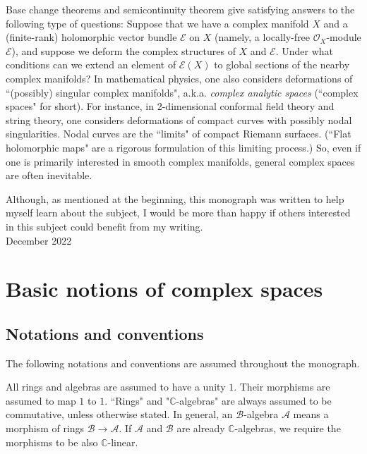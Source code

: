 \documentclass[12pt,b5paper,notitlepage]{report}
\theoremstyle{definition}
\theoremstyle{plain}
\newcommand{\mc}{\mathcal}
\newcommand{\scr}{\mathscr}
\newcommand{\Cbb}{\mathbb C}
\numberwithin{equation}{section}
\begin{document}
Base change theorems and semicontinuity theorem give satisfying answers to the following type of questions: Suppose that we have a complex manifold $X$ and a (finite-rank) holomorphic vector bundle $\scr E$ on $X$ (namely, a locally-free $\scr O_X$-module $\scr E$), and suppose we deform the complex structures of $X$ and $\scr E$. Under what conditions can we extend an element of $\scr E(X)$ to global sections of  the nearby complex manifolds? In mathematical physics, one also considers deformations of ``(possibly) singular complex manifolds", a.k.a. \emph{complex analytic spaces} (``complex spaces" for short). For instance, in 2-dimensional conformal field theory and string theory, one considers deformations of compact curves with possibly nodal singularities. Nodal curves are the ``limits" of compact Riemann surfaces. (``Flat holomorphic maps" are a rigorous formulation of this limiting process.) So, even if one is primarily interested in smooth complex manifolds, general complex spaces are often inevitable.


Although, as mentioned at the beginning, this monograph was written to help myself learn about the subject, I would be more than happy if others interested in this subject could benefit from my writing.\\








\hfill December 2022

\chapter{Basic notions of complex spaces}

\section{Notations and conventions}




The following notations and conventions are assumed throughout the monograph.

All rings and algebras are assumed to have a unity $1$.  Their morphisms are assumed to map $1$ to $1$. ``Rings" and "$\Cbb$-algebras" are always assumed to be commutative, unless otherwise stated. In general, an $\mc B$-algebra $\mc A$ means a morphism of rings $\mc B\rightarrow\mc A$. If $\mc A$ and $\mc B$ are already $\Cbb$-algebras, we require the morphisms to be also $\Cbb$-linear.
\end{document}
